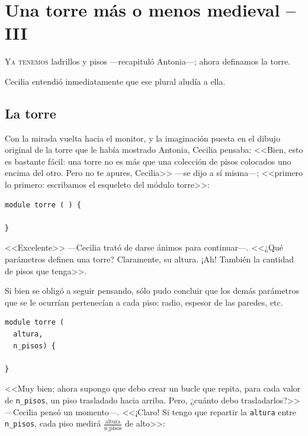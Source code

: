 \chapter{Una torre más o menos medieval -- III}

\lettrine[ante=\raisebox{-1.5ex}{\Large ---},lines=2]{Y}{a tenemos}
ladrillos y pisos ---recapituló Antonia---; ahora definamos la torre.

Cecilia entendió inmediatamente que ese plural aludía a ella.

\section{La torre}

Con la mirada vuelta hacia el monitor, y la imaginación puesta en el
dibujo original de la torre que le había mostrado Antonia, Cecilia
pensaba: <<Bien, esto es bastante fácil: una torre no es más que una
colección de pisos colocados uno encima del otro. Pero no te apures,
Cecilia>> ---se dijo a sí misma---; <<primero lo primero: escribamos
el esqueleto del módulo torre>>:

\begin{lstlisting}
module torre ( ) {

}
\end{lstlisting}

<<Excelente>> ---Cecilia trató de darse ánimos para
con\-ti\-nuar---. <<¿Qué parámetros definen una torre? Claramente, su
altura. ¡Ah! También la cantidad de pisos que tenga>>.

Si bien se obligó a seguir pensando, sólo pudo concluir que los demás
parámetros que se le ocurrían pertenecían a cada piso: radio, espesor
de las paredes, etc.

    \begin{lstlisting}
module torre (
  altura,
  n_pisos) {

}
    \end{lstlisting}


    <<Muy bien; ahora supongo que debo crear un bucle que repita, para
    cada valor de \texttt{n\_pisos}, un piso trasladado hacia
    arriba. Pero, ¿cuánto debo trasladarlos?>> ---Ce\-ci\-lia pensó un
    mo\-men\-to---. <<¡Claro! Si tengo que repartir la \texttt{altura}
    entre \texttt{n\_pisos}, cada piso medirá
    $\frac{\text{altura}}{\text{n\_pisos}}$ de alto>>:

